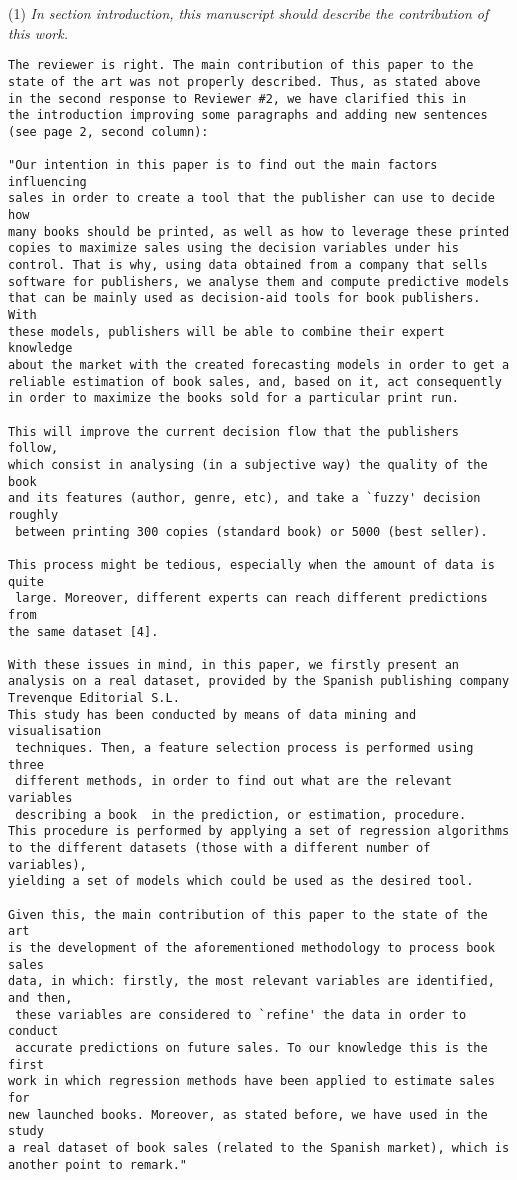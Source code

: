 \documentclass[preprint]{elsarticle}
\begin{document}
\noindent (1) \emph{In section introduction, this manuscript should describe the contribution of this work. } 

\begin{verbatim}
The reviewer is right. The main contribution of this paper to the 
state of the art was not properly described. Thus, as stated above 
in the second response to Reviewer #2, we have clarified this in 
the introduction improving some paragraphs and adding new sentences 
(see page 2, second column):

"Our intention in this paper is to find out the main factors influencing
sales in order to create a tool that the publisher can use to decide how 
many books should be printed, as well as how to leverage these printed
copies to maximize sales using the decision variables under his
control. That is why, using data obtained from a company that sells
software for publishers, we analyse them and compute predictive models 
that can be mainly used as decision-aid tools for book publishers. With 
these models, publishers will be able to combine their expert knowledge 
about the market with the created forecasting models in order to get a 
reliable estimation of book sales, and, based on it, act consequently 
in order to maximize the books sold for a particular print run. 

This will improve the current decision flow that the publishers follow, 
which consist in analysing (in a subjective way) the quality of the book 
and its features (author, genre, etc), and take a `fuzzy' decision roughly
 between printing 300 copies (standard book) or 5000 (best seller).

This process might be tedious, especially when the amount of data is quite
 large. Moreover, different experts can reach different predictions from 
the same dataset [4].

With these issues in mind, in this paper, we firstly present an 
analysis on a real dataset, provided by the Spanish publishing company 
Trevenque Editorial S.L.
This study has been conducted by means of data mining and visualisation
 techniques. Then, a feature selection process is performed using three
 different methods, in order to find out what are the relevant variables
 describing a book  in the prediction, or estimation, procedure. 
This procedure is performed by applying a set of regression algorithms 
to the different datasets (those with a different number of variables), 
yielding a set of models which could be used as the desired tool. 

Given this, the main contribution of this paper to the state of the art 
is the development of the aforementioned methodology to process book sales 
data, in which: firstly, the most relevant variables are identified, and then,
 these variables are considered to `refine' the data in order to conduct
 accurate predictions on future sales. To our knowledge this is the first 
work in which regression methods have been applied to estimate sales for 
new launched books. Moreover, as stated before, we have used in the study 
a real dataset of book sales (related to the Spanish market), which is 
another point to remark."
\end{verbatim}
\end{document}
